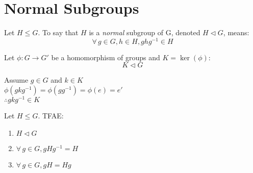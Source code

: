 \documentclass[letterpaper,12pt,fleqn]{article}
\newcommand{\n}{\mathrel{\triangleleft}}
\newcommand{\p}{\phi}
\begin{document}
\section*{Normal Subgroups}

\begin{definition}
  Let $H\le G$. To say that $H$ is a \emph{normal} subgroup of G,
  denoted $H\n G$, means:
  \[\forall\,g\in G,h\in H,ghg^{-1}\in H\]
\end{definition}

\begin{theorem}
  Let $\p:G\to G'$ be a homomorphism of groups and $K=\ker(\p)$:
  \[K\n G\]
\end{theorem}

\begin{theproof}
  Assume $g\in G$ and $k\in K$ \\
  $\p(gkg^{-1})=\p(gg^{-1})=\p(e)=e'$ \\
  $\therefore gkg^{-1}\in K$
\end{theproof}

\begin{theorem}
  Let $H\le G$. TFAE:
  \begin{enumerate}
  \item $H\n G$
  \item $\forall\,g\in G,gHg^{-1}=H$
  \item $\forall\,g\in G,gH=Hg$
  \end{enumerate}
\end{theorem}
\end{document}
